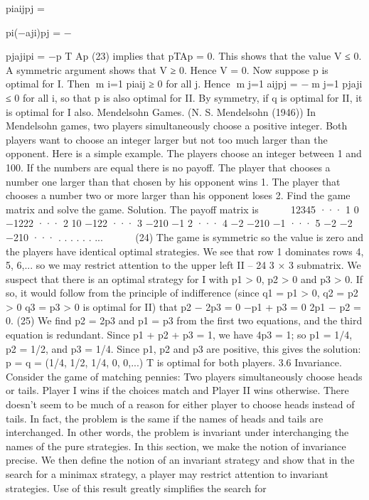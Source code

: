 piaijpj = 

pi(−aji)pj = −


pjajipi = −p
T
Ap (23)
implies that pTAp = 0. This shows that the value V ≤ 0. A symmetric argument shows
that V ≥ 0. Hence V = 0. Now suppose p is optimal for I. Then m
i=1 piaij ≥ 0 for all
j. Hence m
j=1 aijpj = −m
j=1 pjaji ≤ 0 for all i, so that p is also optimal for II. By
symmetry, if q is optimal for II, it is optimal for I also.
Mendelsohn Games. (N. S. Mendelsohn (1946)) In Mendelsohn games, two players
simultaneously choose a positive integer. Both players want to choose an integer larger
but not too much larger than the opponent. Here is a simple example. The players choose
an integer between 1 and 100. If the numbers are equal there is no payoff. The player that
chooses a number one larger than that chosen by his opponent wins 1. The player that
chooses a number two or more larger than his opponent loses 2. Find the game matrix
and solve the game.
Solution. The payoff matrix is
⎛
⎜⎜⎜⎜⎜⎜⎝
12345 ···
1 0 −1222 ···
2 10 −122 ···
3 −210 −1 2 ···
4 −2 −210 −1 ···
5 −2 −2 −210 ··· .
.
. .
.
. ...
⎞
⎟⎟⎟⎟⎟⎟⎠
(24)
The game is symmetric so the value is zero and the players have identical optimal strategies.
We see that row 1 dominates rows 4, 5, 6,... so we may restrict attention to the upper left
II – 24
3 × 3 submatrix. We suspect that there is an optimal strategy for I with p1 > 0, p2 > 0
and p3 > 0. If so, it would follow from the principle of indifference (since q1 = p1 > 0,
q2 = p2 > 0 q3 = p3 > 0 is optimal for II) that
p2 − 2p3 = 0
−p1 + p3 = 0
2p1 − p2 = 0. (25)
We find p2 = 2p3 and p1 = p3 from the first two equations, and the third equation is
redundant. Since p1 + p2 + p3 = 1, we have 4p3 = 1; so p1 = 1/4, p2 = 1/2, and p3 = 1/4.
Since p1, p2 and p3 are positive, this gives the solution: p = q = (1/4, 1/2, 1/4, 0, 0,...)
T is
optimal for both players.
3.6 Invariance. Consider the game of matching pennies: Two players simultaneously
choose heads or tails. Player I wins if the choices match and Player II wins otherwise.
There doesn’t seem to be much of a reason for either player to choose heads instead of
tails. In fact, the problem is the same if the names of heads and tails are interchanged. In
other words, the problem is invariant under interchanging the names of the pure strategies.
In this section, we make the notion of invariance precise. We then define the notion of
an invariant strategy and show that in the search for a minimax strategy, a player may
restrict attention to invariant strategies. Use of this result greatly simplifies the search for
